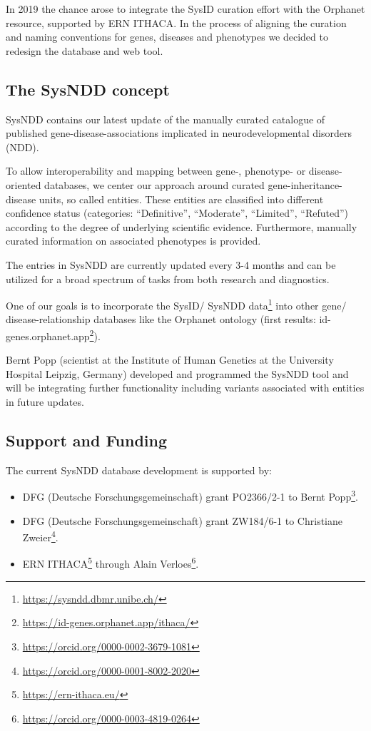 \documentclass[
]{article}
\providecommand{\tightlist}{%
  \setlength{\itemsep}{0pt}\setlength{\parskip}{0pt}}
\renewcommand{\href}[2]{#2\footnote{\url{#1}}}
\begin{document}
In 2019 the chance arose to integrate the SysID curation effort with the Orphanet resource, supported by ERN ITHACA. In the process of aligning the curation and naming conventions for genes, diseases and phenotypes we decided to redesign the database and web tool.

\hypertarget{the-sysndd-concept}{%
\subsection*{The SysNDD concept}\label{the-sysndd-concept}}

SysNDD contains our latest update of the manually curated catalogue of published gene-disease-associations implicated in neurodevelopmental disorders (NDD).

To allow interoperability and mapping between gene-, phenotype- or disease-oriented databases, we center our approach around curated gene-inheritance-disease units, so called entities. These entities are classified into different confidence status (categories: ``Definitive'', ``Moderate'', ``Limited'', ``Refuted'') according to the degree of underlying scientific evidence. Furthermore, manually curated information on associated phenotypes is provided.

The entries in SysNDD are currently updated every 3-4 months and can be utilized for a broad spectrum of tasks from both research and diagnostics.

One of our goals is to incorporate the SysID/ \href{https://sysndd.dbmr.unibe.ch/}{SysNDD data} into other gene/ disease-relationship databases like the Orphanet ontology (first results: \href{https://id-genes.orphanet.app/ithaca/}{id-genes.orphanet.app}).

Bernt Popp (scientist at the Institute of Human Genetics at the University Hospital Leipzig, Germany) developed and programmed the SysNDD tool and will be integrating further functionality including variants associated with entities in future updates.

\hypertarget{support-and-funding}{%
\subsection*{Support and Funding}\label{support-and-funding}}

The current SysNDD database development is supported by:

\begin{itemize}
\tightlist
\item
  DFG (Deutsche Forschungsgemeinschaft) grant PO2366/2-1 to \href{https://orcid.org/0000-0002-3679-1081}{Bernt Popp}.
\item
  DFG (Deutsche Forschungsgemeinschaft) grant ZW184/6-1 to \href{https://orcid.org/0000-0001-8002-2020}{Christiane Zweier}.
\item
  \href{https://ern-ithaca.eu/}{ERN ITHACA} through \href{https://orcid.org/0000-0003-4819-0264}{Alain Verloes}.
\end{itemize}
\end{document}
